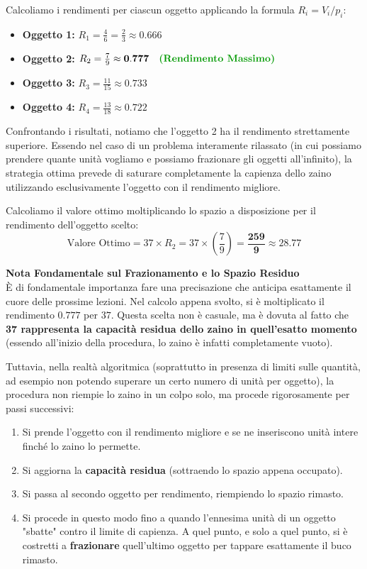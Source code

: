 \documentclass[12pt, a4paper]{article}
\begin{document}
	Calcoliamo i rendimenti per ciascun oggetto applicando la formula $R_i = V_i / p_i$:
	\begin{itemize}[label=$\circ$, itemsep=4pt, leftmargin=1.5cm]
		\item \textbf{Oggetto 1:} $R_1 = \frac{4}{6} = \frac{2}{3} \approx 0.666$
		\item \textbf{Oggetto 2:} $R_2 = \frac{7}{9} \approx \mathbf{0.777} \quad \text{\textcolor{green!60!black}{\textbf{(Rendimento Massimo)}}}$
		\item \textbf{Oggetto 3:} $R_3 = \frac{11}{15} \approx 0.733$
		\item \textbf{Oggetto 4:} $R_4 = \frac{13}{18} \approx 0.722$
	\end{itemize}
	
	Confrontando i risultati, notiamo che l'oggetto 2 ha il rendimento strettamente superiore. Essendo nel caso di un problema interamente rilassato (in cui possiamo prendere quante unità vogliamo e possiamo frazionare gli oggetti all'infinito), la strategia ottima prevede di saturare completamente la capienza dello zaino utilizzando esclusivamente l'oggetto con il rendimento migliore.
	
	Calcoliamo il valore ottimo moltiplicando lo spazio a disposizione per il rendimento dell'oggetto scelto:
	\[
	\text{Valore Ottimo} = 37 \times R_2 = 37 \times \left(\frac{7}{9}\right) = \mathbf{\frac{259}{9}} \approx 28.77
	\]
	
	\vspace{0.4cm}
	\textbf{Nota Fondamentale sul Frazionamento e lo Spazio Residuo}\\
	È di fondamentale importanza fare una precisazione che anticipa esattamente il cuore delle prossime lezioni. 
	Nel calcolo appena svolto, si è moltiplicato il rendimento $0.777$ per $37$. Questa scelta non è casuale, ma è dovuta al fatto che \textbf{37 rappresenta la capacità residua dello zaino in quell'esatto momento} (essendo all'inizio della procedura, lo zaino è infatti completamente vuoto).
	
	Tuttavia, nella realtà algoritmica (soprattutto in presenza di limiti sulle quantità, ad esempio non potendo superare un certo numero di unità per oggetto), la procedura non riempie lo zaino in un colpo solo, ma procede rigorosamente per passi successivi:
	\begin{enumerate}
		\item Si prende l'oggetto con il rendimento migliore e se ne inseriscono unità intere finché lo zaino lo permette.
		\item Si aggiorna la \textbf{capacità residua} (sottraendo lo spazio appena occupato).
		\item Si passa al secondo oggetto per rendimento, riempiendo lo spazio rimasto.
		\item Si procede in questo modo fino a quando l'ennesima unità di un oggetto "sbatte" contro il limite di capienza. A quel punto, e solo a quel punto, si è costretti a \textbf{frazionare} quell'ultimo oggetto per tappare esattamente il buco rimasto.
	\end{enumerate}
	
\end{document}
